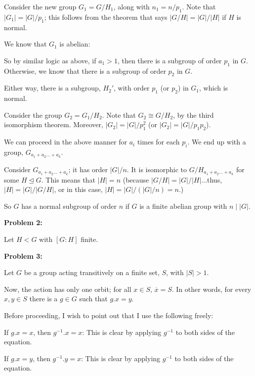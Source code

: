 \documentclass[a4paper,12pt]{article}
\newcommand{\tab}{\hspace{4mm}} %
\newcommand{\shunt}{\vspace{20mm}}
\newcommand{\absval}[1]{\lvert #1 \rvert}
\newcommand{\subgp}{\mathrel{\unlhd}}
\begin{document}
\tab Consider the new group $G_1=G/H_1$, along with $n_1 = n/p_1$. Note that $\absval{G_1} = \absval{G}/p_1$; this follows from the theorem that says $\absval{G/H} = \absval{G}/\absval{H}$ if $H$ is normal.

\tab We know that $G_1$ is abelian:

\tab \tab %

\tab So by similar logic as above, if $a_1 > 1$, then there is a subgroup of order $p_1$ in $G$. Otherwise, we know that there is a subgroup of order $p_2$ in $G$.

\tab Either way, there is a subgroup, $H_2'$, with order $p_1$ (or $p_2$) in $G_1$, which is normal. %

\tab Consider the group $G_2=G_1/H_2$. Note that $G_2 \cong G/H_2$, by the third isomorphism theorem. Moreover, $\absval{G_2} = \absval{G}/p_1^2$ (or $\absval{G_2} = \absval{G}/p_1p_2$).

\tab We can proceed in the above manner for $a_i$ times for each $p_i$. We end up with a group, $G_{a_1+a_2 \ldots + a_k}$.

Consider $G_{a_1+a_2 \ldots +a_k}$; it has order $\absval{G}/n$. It is isomorphic to $G/H_{a_1+a_2 \ldots +a_k}$ for some $H \subgp G$. This means that $\absval{H} = n$ (because $\absval{G/H} = \absval{G}/\absval{H}$...thus, $\absval{H} = \absval{G}/\absval{G/H}$, or in this case, $\absval{H} = \absval{G}/(\absval{G}/n) = n$.)

So $G$ has a normal subgroup of order $n$ if $G$ is a finite abelian group with $n \mid \absval{G}$.

\shunt

{\bf Problem 2:}

Let $H < G$ with $[G:H]$ finite.

\shunt

{\bf Problem 3:}

Let $G$ be a group acting transitively on a finite set, $S$, with $\absval{S} > 1$.

Now, the action has only one orbit; for all $x \in S$, $\overline{x} = S$. In other words, for every $x, y \in S$ there is a $g \in G$ such that $g.x = y$.

Before proceeding, I wish to point out that I use the following freely:

\tab If $g.x = x$, then $g^{-1}.x=x$: This is clear by applying $g^{-1}$ to both sides of the equation.

\tab If $g.x=y$, then $g^{-1}.y=x$: This is clear by applying $g^{-1}$ to both sides of the equation.
\end{document}
